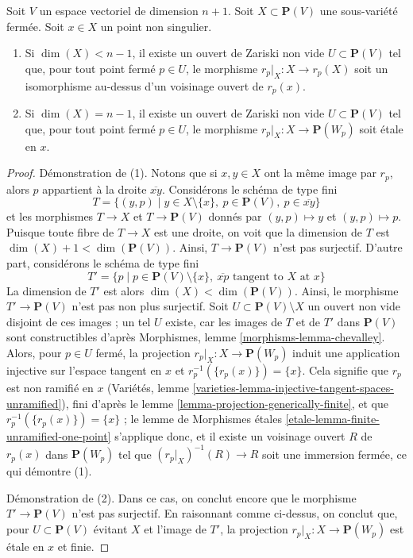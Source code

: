 \begin{lemma}
\label{lemma-projection-generically-immersion}
Soit $V$ un espace vectoriel de dimension $n + 1$.
Soit $X \subset \mathbf{P}(V)$ une sous-variété fermée.
Soit $x \in X$ un point non singulier.
\begin{enumerate}
\item Si $\dim(X) < n - 1$, il existe un ouvert de Zariski non vide
$U \subset \mathbf{P}(V)$ tel que, pour tout point fermé $p \in U$, le
morphisme $r_p|_X : X \to r_p(X)$ soit un
isomorphisme au-dessus d'un voisinage ouvert de $r_p(x)$.
\item Si $\dim(X) = n - 1$, il existe un ouvert de Zariski non vide
$U \subset \mathbf{P}(V)$ tel que, pour tout point fermé $p \in U$, le
morphisme $r_p|_X : X \to \mathbf{P}(W_p)$ soit \'etale en $x$.
\end{enumerate}
\end{lemma}

\begin{proof}
Démonstration de (1). Notons que si $x, y \in X$ ont la même image par
$r_p$, alors $p$ appartient à la droite $\overline{xy}$.
Considérons le schéma de type fini
$$
T = \{(y, p) \mid
y \in X \setminus \{x\},\ p \in \mathbf{P}(V),\ p \in \overline{xy}\}
$$
et les morphismes $T \to X$ et $T \to \mathbf{P}(V)$ donnés par
$(y, p) \mapsto y$ et $(y, p) \mapsto p$.
Puisque toute fibre de $T \to X$ est une droite, on voit que
la dimension de $T$ est $\dim(X) + 1 < \dim(\mathbf{P}(V))$.
Ainsi, $T \to \mathbf{P}(V)$ n'est pas surjectif. D'autre part,
considérons le schéma de type fini
$$
T' = \{p \mid
p \in \mathbf{P}(V) \setminus \{x\},
\ \overline{xp}\text{ tangent to }X\text{ at }x\}
$$
La dimension de $T'$ est alors $\dim(X) < \dim(\mathbf{P}(V))$.
Ainsi, le morphisme $T' \to \mathbf{P}(V)$ n'est pas non plus surjectif.
Soit $U \subset \mathbf{P}(V) \setminus X$ un ouvert non vide disjoint
de ces images ; un tel $U$ existe, car les images de $T$ et de $T'$
dans $\mathbf{P}(V)$ sont constructibles d'après
Morphismes, lemme \ref{morphisms-lemma-chevalley}.
Alors, pour $p \in U$ fermé, la projection
$r_p|_X : X \to \mathbf{P}(W_p)$ induit une application injective sur
l'espace tangent en $x$ et $r_p^{-1}(\{r_p(x)\}) = \{x\}$.
Cela signifie que $r_p$ est non ramifié en $x$
(Variétés, lemme \ref{varieties-lemma-injective-tangent-spaces-unramified}),
fini d'après le lemme \ref{lemma-projection-generically-finite},
et que $r_p^{-1}(\{r_p(x)\}) = \{x\}$ ; le lemme de Morphismes \'etales
\ref{etale-lemma-finite-unramified-one-point} s'applique donc, et
il existe un voisinage ouvert $R$ de $r_p(x)$
dans $\mathbf{P}(W_p)$ tel que $(r_p|_X)^{-1}(R) \to R$ soit une
immersion fermée, ce qui démontre (1).

\medskip\noindent
Démonstration de (2). Dans ce cas, on conclut encore que le morphisme
$T' \to \mathbf{P}(V)$ n'est pas surjectif.
En raisonnant comme ci-dessus, on conclut que, pour $U \subset \mathbf{P}(V)$
évitant $X$ et l'image de $T'$, la projection
$r_p|_X : X \to \mathbf{P}(W_p)$ est \'etale en $x$ et finie.
\end{proof}


